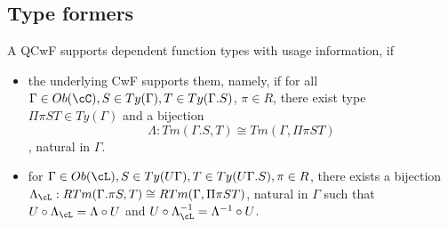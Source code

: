 \documentclass[12pt,a4paper]{article}
\def\rfl{_{refl}}\alwaysmath{rfl}
\renewcommand{\O}{_{O}}\alwaysmath{O}
\def\R{_{R}}\alwaysmath{R}
\begin{document}
%    
%    
%    
%  

\subsection*{Type formers}


\begin{definition}
  A QCwF supports dependent function types with usage information, if
  \begin{itemize}
    
    \item the underlying CwF \cC supports them, namely, if for all $\Gamma \in \ob\cC, S \in Ty(\Gamma), T \in Ty(\Gamma . S)$, $\pi \in R$, there exist type $\Pi\pi S T \in Ty(\Gamma)$ and a bijection $$\Lambda : Tm(\Gamma.S, T) \cong Tm(\Gamma, \Pi\pi S T) \label{eq:dep-prod-cwf}$$, natural in $\Gamma$.
    
    \item for $\Gamma \in \ob\cL, S \in Ty(U\Gamma), T \in Ty(U\Gamma . S), \pi \in R$, there exists a bijection $\Lambda_\cL : RTm(\Gamma.\pi S, T) \cong RTm(\Gamma, \Pi\pi S T) \label{eq:dep-prod-qcwf}$, natural in $\Gamma$ such that $U \comp \Lambda_\cL = \Lambda \comp U$ and $U \comp \Lambda^{-1}_\cL = \Lambda^{-1}\comp U$.    
  
  \end{itemize}  
\end{definition}
\end{document}
